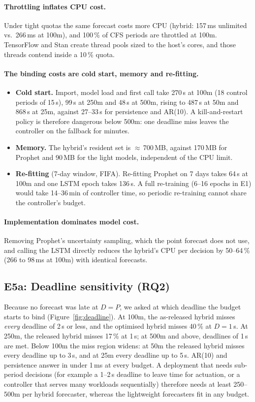 \documentclass[conference,a4paper]{IEEEtran}
\begin{document}
\paragraph{Throttling inflates CPU cost.} Under tight quotas the same forecast costs more CPU (hybrid: 157\,ms
unlimited vs.\ 266\,ms at 100m), and 100\,\% of CFS periods are throttled at 100m. TensorFlow and Stan create
thread pools sized to the host's cores, and those threads contend inside a 10\,\% quota.

\paragraph{The binding costs are cold start, memory and re-fitting.}
\begin{itemize}
\item \textbf{Cold start.} Import, model load and first call take 270\,s at 100m (18 control periods of 15\,s),
      99\,s at 250m and 48\,s at 500m, rising to 487\,s at 50m and 868\,s at 25m, against 27--33\,s for persistence and AR(10). A kill-and-restart policy is
      therefore dangerous below 500m: one deadline miss leaves the controller on the fallback for minutes.
\item \textbf{Memory.} The hybrid's resident set is $\approx$\,700\,MB, against 170\,MB for Prophet and 90\,MB for
      the light models, independent of the CPU limit.
\item \textbf{Re-fitting} (7-day window, FIFA). Re-fitting Prophet on 7 days takes 64\,s at 100m and one LSTM
      epoch takes 136\,s. A full re-training (6--16 epochs in E1) would take 14--36\,min of controller time, so
      periodic re-training cannot share the controller's budget.
\end{itemize}

\paragraph{Implementation dominates model cost.} Removing Prophet's uncertainty sampling, which the point
forecast does not use, and calling the LSTM directly reduces the hybrid's CPU per decision by 50--64\,\% (266 to
98\,ms at 100m) with identical forecasts.

\subsection{E5a: Deadline sensitivity (RQ2)}
Because no forecast was late at $D=P$, we asked at which deadline the budget starts to bind
(Figure~\ref{fig:deadline}). At 100m, the as-released hybrid misses \emph{every}
deadline of 2\,s or less, and the optimised hybrid misses 40\,\% at $D=1$\,s. At 250m, the released hybrid
misses 17\,\% at 1\,s; at 500m and above, deadlines of 1\,s are met. Below 100m the miss region widens: at 50m
the released hybrid misses every deadline up to 3\,s, and at 25m every deadline up to 5\,s. AR(10) and persistence answer in under 1\,ms
at every budget. A deployment that needs sub-period decisions (for example a 1--2\,s deadline to leave time for
actuation, or a controller that serves many workloads sequentially) therefore needs at least 250--500m per
hybrid forecaster, whereas the lightweight forecasters fit in any budget.
\end{document}

